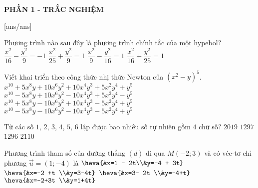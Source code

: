 
\begin{center}
	\textbf{PHẦN 1 - TRẮC NGHIỆM}
\end{center}
[ans/ans]
\begin{ex}%
	Phương trình nào sau đây là phương trình chính tắc của một hypebol?
	\choice
	{$\dfrac{x^2}{16} - \dfrac{y^2}{9} = -1$}
	{$\dfrac{x^2}{25} + \dfrac{y^2}{9} = 1$}
	{\True $\dfrac{x^2}{9} - \dfrac{y^2}{16} = 1$}
	{$\dfrac{x^2}{16} + \dfrac{y^2}{25} = 1$}
\end{ex}

\begin{ex}%
	Viết khai triển theo công thức nhị thức Newton của $\left(x^2 - y\right)^5$.
	\choice
	{$x^{10} + 5x^8y + 10x^6y^2 + 10x^4y^3 + 5x^2y^4 + y^5$}
	{\True $x^{10} - 5x^8y + 10x^6y^2 - 10x^4y^3 + 5x^2y^4 - y^5$}
	{$x^{10} + 5x^8y - 10x^6y^2 + 10x^4y^3 - 5x^2y^4 + y^5$}
	{$x^{10} - 5x^8y - 10x^6y^2 - 10x^4y^3 - 5x^2y^4 + y^5$}
\end{ex}

\begin{ex}%
	Từ các số $1$, $2$, $3$, $4$, $5$, $6$ lập được bao nhiêu số tự nhiên gồm $4$ chữ số?
	\choice
	{$2019$}
	{$1297$}
	{\True $1296$}
	{$2110$}
\end{ex}

\begin{ex}%
	Phương trình tham số của đường thẳng $(d)$ đi qua $M(-2;3)$ và có véc-tơ chỉ phương $\overrightarrow{u} = (1;-4)$ là
	\choice
	{$\heva{&x=1 - 2t\\&y=-4 + 3t}$}
	{\True $\heva{&x=-2 +t \\&y=3-4t}$}
	{$\heva{&x=3- 2t \\&y=-4+t}$}
	{$\heva{&x=-2+3t \\&y=1+4t}$}
\end{ex}

